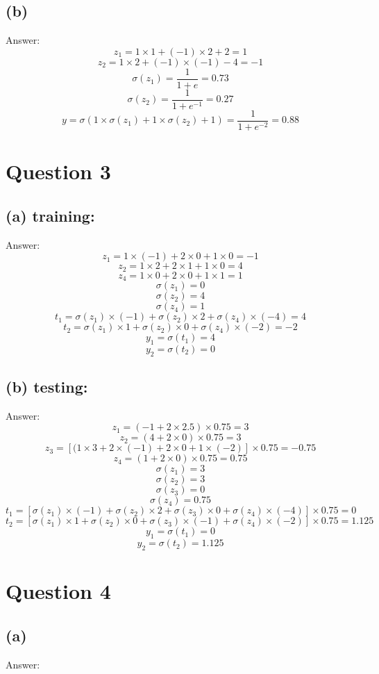 \documentclass[18pt, A4]{article}
\begin{document}
    \subsection*{(b)}
    Answer:
          $$z_1 = 1 \times 1 + (-1) \times 2 + 2 = 1 $$
          $$z_2 = 1 \times 2 + (-1) \times (-1) -4 = -1$$ 
          $$\sigma (z_1) = \frac{1}{1+e}= 0.73$$  
          $$\sigma (z_2) = \frac{1}{1+e^{-1}} = 0.27$$
          $$y = \sigma(1\times \sigma(z_1) + 1\times \sigma(z_2) + 1) = \frac{1}{1+e^{-2}} = 0.88 $$      
    \section*{Question 3}
    \subsection*{(a) training:}
    Answer:
        $$z_1 = 1\times(-1) + 2\times 0 + 1\times 0 = -1$$
        $$z_2 = 1\times 2 + 2\times1 + 1\times 0 = 4$$
        $$z_4 = 1\times 0 + 2\times 0 + 1\times 1 = 1$$
        $$\sigma(z_1) = 0$$
        $$\sigma(z_2) = 4$$
        $$\sigma(z_4) = 1$$
        $$t_1 = \sigma(z_1) \times (-1) + \sigma(z_2) \times 2 + \sigma(z_4) \times  (-4) = 4$$
        $$t_2 = \sigma(z_1) \times 1 + \sigma(z_2) \times 0 + \sigma(z_4) \times (-2) = -2$$
        $$y_1 = \sigma(t_1) = 4$$
        $$y_2 = \sigma(t_2) = 0$$
    \subsection*{(b) testing:}
    Answer:
        $$z_1 = (-1 + 2\times2.5)\times 0.75 = 3$$
        $$z_2 = (4 + 2\times0)\times 0.75 = 3$$
        $$z_3 = [(1\times 3 + 2\times (-1) + 2\times0 + 1\times (-2)] \times 0.75 = -0.75$$
        $$z_4 = (1+2\times0)\times 0.75 = 0.75$$
        $$\sigma(z_1) = 3$$
        $$\sigma(z_2) = 3$$
        $$\sigma(z_3) = 0$$
        $$\sigma(z_4) = 0.75$$
        $$t_1 = [\sigma(z_1) \times (-1) + \sigma(z_2) \times 2 + \sigma(z_3)\times 0 +\sigma(z_4) \times  (-4)] \times 0.75 = 0$$
        $$t_2 = [\sigma(z_1) \times 1 + \sigma(z_2) \times 0 +  \sigma(z_3)\times (-1) +\sigma(z_4) \times (-2)] \times 0.75 = 1.125$$
        $$y_1 = \sigma(t_1) = 0$$
        $$y_2 = \sigma(t_2) = 1.125$$
    
    \section*{Question 4}
    \subsection*{(a)}
    Answer:
    \\
    
\end{document}
